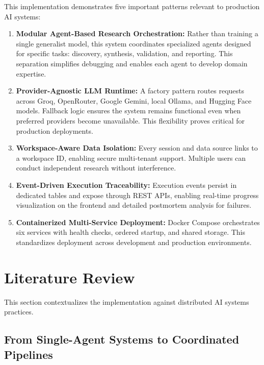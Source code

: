 \documentclass[12pt, a4paper]{article}
\begin{document}
This implementation demonstrates five important patterns relevant to production AI systems:

\begin{enumerate}[label=\textbf{\alph*}.]
  \item \textbf{Modular Agent-Based Research Orchestration:} Rather than training a single
        generalist model, this system coordinates specialized agents designed for specific
        tasks: discovery, synthesis, validation, and reporting. This separation simplifies
        debugging and enables each agent to develop domain expertise.
  \item \textbf{Provider-Agnostic LLM Runtime:} A factory pattern routes requests across
        Groq, OpenRouter, Google Gemini, local Ollama, and Hugging Face models. Fallback
        logic ensures the system remains functional even when preferred providers become
        unavailable. This flexibility proves critical for production deployments.
  \item \textbf{Workspace-Aware Data Isolation:} Every session and data source links to a
        workspace ID, enabling secure multi-tenant support. Multiple users can conduct
        independent research without interference.
  \item \textbf{Event-Driven Execution Traceability:} Execution events persist in dedicated
        tables and expose through REST APIs, enabling real-time progress visualization on
        the frontend and detailed postmortem analysis for failures.
  \item \textbf{Containerized Multi-Service Deployment:} Docker Compose orchestrates six
        services with health checks, ordered startup, and shared storage. This standardizes
        deployment across development and production environments.
\end{enumerate}

\section{Literature Review}

This section contextualizes the implementation against distributed AI systems practices.

\subsection{From Single-Agent Systems to Coordinated Pipelines}
\end{document}
